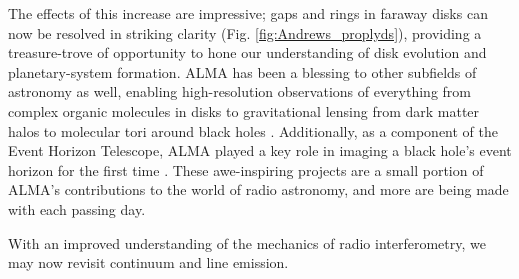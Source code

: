 \begin{figure}[htp]
  \hspace*{\fill}%
  \hfill%
  \hspace*{\fill}%
\end{figure}


The effects of this increase are impressive; gaps and rings in faraway disks can now be resolved in striking clarity (Fig. \ref{fig:Andrews_proplyds}), providing a treasure-trove of opportunity to hone our understanding of disk evolution and planetary-system formation. ALMA has been a blessing to other subfields of astronomy as well, enabling high-resolution observations of everything from complex organic molecules in disks \citep{Walsh2016,Podio2019} to gravitational lensing from dark matter halos \citep{Herrera-Martin2019} to molecular tori around black holes \citep{Combes2018}. Additionally, as a component of the Event Horizon Telescope, ALMA played a key role in imaging a black hole's event horizon for the first time \citep{EHTCollab2019}. These awe-inspiring projects are a small portion of ALMA's contributions to the world of radio astronomy, and more are being made with each passing day.


With an improved understanding of the mechanics of radio interferometry, we may now revisit continuum and line emission.





